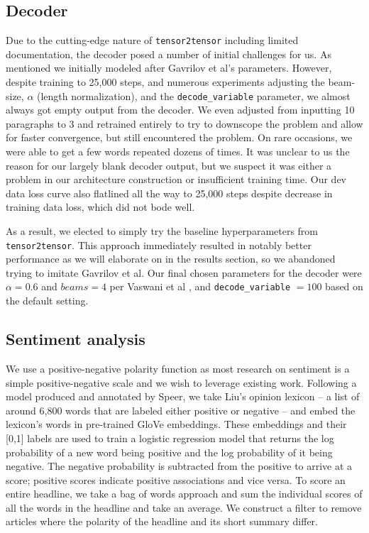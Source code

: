 \documentclass[11pt]{article}
\begin{document}
\subsection{Decoder}
Due to the cutting-edge nature of \texttt{tensor2tensor} including limited documentation, the decoder posed a number of initial challenges for us. As mentioned we initially modeled after Gavrilov et al's parameters. However, despite training to 25,000 steps, and numerous experiments adjusting the beam-size, $\alpha$ (length normalization), and the \texttt{decode\_variable} parameter, we almost always got empty output from the decoder. We even adjusted from inputting 10 paragraphs to 3 and retrained entirely to try to downscope the problem and allow for faster convergence, but still encountered the problem. On rare occasions, we were able to get a few words repeated dozens of times. It was unclear to us the reason for our largely blank decoder output, but we suspect it was either a problem in our architecture construction or insufficient training time. Our dev data loss curve also flatlined all the way to 25,000 steps despite decrease in training data loss, which did not bode well.

As a result, we elected to simply try the baseline hyperparameters from \texttt{tensor2tensor}. This approach immediately resulted in notably better performance as we will elaborate on in the results section, so we abandoned trying to imitate Gavrilov et al. Our final chosen parameters for the decoder were $\alpha=0.6$ and $beams=4$ per Vaswani et al \cite{DBLP:journals/corr/VaswaniSPUJGKP17}, and \texttt{decode\_variable} $=100$ based on the default setting.

\subsection{Sentiment analysis}
We use a positive-negative polarity function as most research on sentiment is a simple positive-negative scale and we wish to leverage existing work. Following a model produced and annotated by Speer\cite{RacistAI}, we take Liu's opinion lexicon\cite{Hu:2004:MSC:1014052.1014073} -- a list of around 6,800 words that are labeled either positive or negative -- and embed the lexicon's words in pre-trained GloVe embeddings. These embeddings and their [0,1] labels are used to train a logistic regression model that returns the log probability of a new word being positive and the log probability of it being negative. The negative probability is subtracted from the positive to arrive at a score; positive scores indicate positive associations and vice versa. To score an entire headline, we take a bag of words approach and sum the individual scores of all the words in the headline and take an average. We construct a filter to remove articles where the polarity of the headline and its short summary differ.
\end{document}

